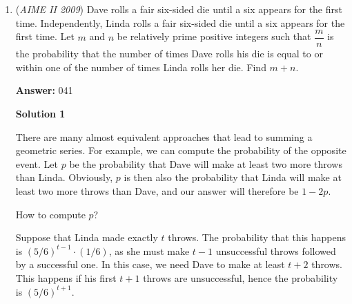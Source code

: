 \begin{enumerate}
 



\textbf{Solution 4}

Using the initial steps from Solution 1, $S=\sum_{i=1}^{2009} \dfrac{{2i\choose i}}{2^{2i}}$. Clearly $b = 1$ as in all the summands there are no non-power of 2 factors in the denominator. So we seek to find $a$. Note that $2^a$ would be the largest denominator in all the summands, so when they are summed it is the common denominator. 

 Taking the p-adic valuations of each term, the powers of 2 in the denominator for $i$ is $(2i) - v_2(\binom{2i}{i}).$ We can use Kummers theorem to see that $v_2(\binom{2i}{i})$ is the number of digits carried over when $i$ is added to $i$ in base $2$. This is simply the number of $1$'s in the binary representation of $i$.

 Looking at the binary representations of some of the larger $i$ we see $2009 = 11111011001_2$ having eight $1$'s. So the power of two is $2 \cdot 2009 - 8 = 4010$. Experimenting with $2008, 2007, 2006$ we see that the power of two are all $< 4010$, and under $2005$ the power of two $2i -  v_2(\binom{2i}{i}) < 2i < 4010$. Therefore $a = 4010$ and $\frac{ab}{10} = \boxed{401}.$



	\item (\textit{AIME II 2009}) Dave rolls a fair six-sided die until a six appears for the first time. Independently, Linda rolls a fair six-sided die until a six appears for the first time. Let $m$ and $n$ be relatively prime positive integers such that $\dfrac mn$ is the probability that the number of times Dave rolls his die is equal to or within one of the number of times Linda rolls her die. Find $m+n$.


 
 \textbf{Answer: }041



\textbf{Solution 1}

There are many almost equivalent approaches that lead to summing a geometric series. For example, we can compute the probability of the opposite event. Let $p$ be the probability that Dave will make at least two more throws than Linda. Obviously, $p$ is then also the probability that Linda will make at least two more throws than Dave, and our answer will therefore be $1-2p$.

 How to compute $p$? 

 Suppose that Linda made exactly $t$ throws. The probability that this happens is $(5/6)^{t-1}\cdot (1/6)$, as she must make $t-1$ unsuccessful throws followed by a successful one. In this case, we need Dave to make at least $t+2$ throws. This happens if his first $t+1$ throws are unsuccessful, hence the probability is $(5/6)^{t+1}$.


\end{enumerate}
